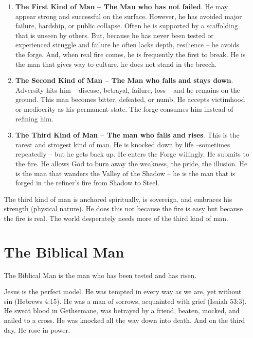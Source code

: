 \documentclass[12pt,a4paper]{book}
\begin{document}
\begin{enumerate}
\item \textbf{The First Kind of Man -- The Man who has not failed}.  He may appear strong and successful on the surface.  However, he has avoided major failure, hardship, or public collapse.  Often he is supported by a scaffolding that is unseen by others.  But, because he has never been tested or experienced struggle and failure he often lacks depth, resilience -- he avoids the forge.  And, when real fire comes, he is frequently the first to break.  He is the man that gives way to culture, he does not stand in the breech.

\item \textbf{The Second Kind of Man -- The Man who falls and stays down}.  Adversity hits him -- disease, betrayal, failure, loss -- and he remains on the ground.  This man becomes bitter, defeated, or numb.  He accepts victimhood or mediocrity as his permanent state.  The forge consumes him instead of refining him. 

\item \textbf{The Third Kind of Man -- The man who falls and rises}.  This is the rarest and strogest kind of man.  He is knocked down by life --sometimes repeatedly -- but he gets back up.  He enters the Forge willingly.  He submits to the fire.  He allows God to burn away the weakness, the pride, the illusion.  He is the man that wanders the Valley of the Shadow -- he is the man that is forged in the refiner's fire from Shadow to Steel.

\end{enumerate}

The third kind of man is anchored spiritually, is sovereign, and embraces his strength (physical nature).  He does this not because the fire is easy but because the fire is real.  The world desperately needs more of the third kind of man.

\section{The Biblical Man}

The Biblical Man is the man who has been tested and has risen.

Jesus is the perfect model. He was tempted in every way as we are, yet without sin (Hebrews 4:15). He was a man of sorrows, acquainted with grief (Isaiah 53:3). He sweat blood in Gethsemane, was betrayed by a friend, beaten, mocked, and nailed to a cross. He was knocked all the way down into death. And on the third day, He rose in power.
\end{document}
